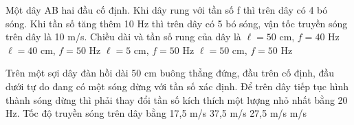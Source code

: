 \begin{vidu}%
Một dây AB hai đầu cố định. Khi dây rung với tần số f thì trên dây có 4 bó sóng. Khi tần số tăng thêm 10 Hz thì trên dây có 5 bó sóng, vận tốc truyền sóng trên dây là 10 m/s. Chiều dài và tần số rung của dây là
\choice
{\True $\ell=50$ cm, $f=40$ Hz}
{$\ell=40$ cm, $f=50$ Hz}
{$\ell=5$ cm, $f=50$ Hz}
{$\ell=50$ cm, $f=50$ Hz}
\end{vidu} %
\begin{vidu}%
Trên một sợi dây đàn hồi dài 50 cm buông thẳng đứng, đầu trên cố định, đầu dưới tự do đang có một sóng dừng với tần số xác định. Để trên dây tiếp tục hình thành sóng dừng thì phải thay đổi tần số kích thích một lượng nhỏ nhất bằng 20 Hz. Tốc độ truyền sóng trên dây bằng
\choice
{17,5 m/s}
{37,5 m/s}
{27,5 m/s}
{ m/s}
\end{vidu} %
